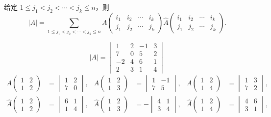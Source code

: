 给定 $1\le j_1<j_2<\cdots<j_k\le n$，则
\[
|A|=\sum_{1\le j_1<j_2<\cdots<j_k\le n}
A\begin{pmatrix}i_1&i_2&\cdots&i_k\\j_1&j_2&\cdots&j_k\end{pmatrix}
\hat{A}\begin{pmatrix}i_1&i_2&\cdots&i_k\\j_1&j_2&\cdots&j_k\end{pmatrix}.
\]

\begin{example}
\[
|A|=\begin{vmatrix}
1&2&-1&3\\
7&0&5&2\\
-2&4&6&1\\
2&3&1&4
\end{vmatrix}
\]
\begin{align*}
A\begin{pmatrix}1&2\\1&2\end{pmatrix}&=\begin{vmatrix}1&2\\7&0\end{vmatrix},&
A\begin{pmatrix}1&2\\1&3\end{pmatrix}&=\begin{vmatrix}1&-1\\7&5\end{vmatrix},&
A\begin{pmatrix}1&2\\1&4\end{pmatrix}&=\begin{vmatrix}1&3\\7&2\end{vmatrix},\\
\hat{A}\begin{pmatrix}1&2\\1&2\end{pmatrix}&=\begin{vmatrix}6&1\\1&4\end{vmatrix},&
\hat{A}\begin{pmatrix}1&2\\1&3\end{pmatrix}&=-\begin{vmatrix}4&1\\3&4\end{vmatrix},&
\hat{A}\begin{pmatrix}1&2\\1&4\end{pmatrix}&=\begin{vmatrix}4&6\\3&1\end{vmatrix},\\

\end{align*}
\end{example}
